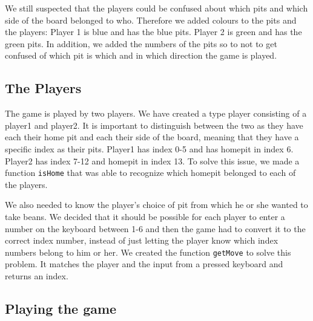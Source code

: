 \documentclass[a4paper]{report}
\begin{document}
We still suspected that the players could be confused about which pits and 
which side of the board belonged to who. Therefore we added colours to the
pits and the players: Player 1 is blue and has the blue pits. Player 2 is green
 and has the green pits. In addition, we added the numbers of the pits so to 
not to get confused of which pit is which and in which direction the game is played.

\subsection*{The Players}
The game is played by two players. We have created a type player consisting of a player1 and player2. It is important to distinguish between the two as they have each their home pit and each their side of the board, meaning that they have a specific index as their pits. Player1 has index 0-5 and has homepit in index 6. Player2 has index 7-12 and homepit in index 13. To solve this issue, we made a function \texttt{isHome} that was able to recognize which homepit belonged to each of the players. 

We also needed to know the player's choice of pit from which he or she wanted to take beans. We decided that it should be possible for each player to enter a number on the keyboard between 1-6 and then the game had to convert it to the correct index number, instead of just letting the player know which index numbers belong to him or her. We created the function \texttt{getMove} to solve this problem. It matches the player and the input from a pressed keyboard and returns an index.

\subsection*{Playing the game}
\end{document}
